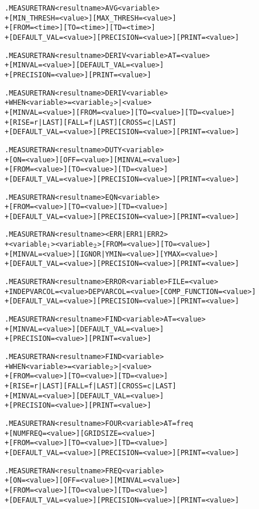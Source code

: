 \begin{Command}
\format
\begin{alltt}
.MEASURE TRAN <result name> AVG <variable>
+ [MIN_THRESH=<value>] [MAX_THRESH=<value>]
+ [FROM=<time>] [TO=<time>] [TD=<time>]
+ [DEFAULT_VAL=<value>] [PRECISION=<value>] [PRINT=<value>]

.MEASURE TRAN <result name> DERIV <variable> AT=<value>
+ [MINVAL=<value>] [DEFAULT_VAL=<value>] 
+ [PRECISION=<value>] [PRINT=<value>]

.MEASURE TRAN <result name> DERIV <variable>
+ WHEN <variable>=<variable\(\sb{2}\)>|<value>
+ [MINVAL=<value>] [FROM=<value>] [TO=<value>] [TD=<value>] 
+ [RISE=r|LAST] [FALL=f|LAST] [CROSS=c|LAST]
+ [DEFAULT_VAL=<value>] [PRECISION=<value>] [PRINT=<value>]

.MEASURE TRAN <result name> DUTY <variable>
+ [ON=<value>] [OFF=<value>] [MINVAL=<value>]
+ [FROM=<value>] [TO=<value>] [TD=<value>]
+ [DEFAULT_VAL=<value>] [PRECISION=<value>] [PRINT=<value>]

.MEASURE TRAN <result name> EQN <variable>
+ [FROM=<value>] [TO=<value>] [TD=<value>]
+ [DEFAULT_VAL=<value>] [PRECISION=<value>] [PRINT=<value>]

.MEASURE TRAN <result name> <ERR|ERR1|ERR2>
+ <variable\(\sb{1}\)> <variable\(\sb{2}\)> [FROM=<value>] [TO=<value>]
+ [MINVAL=<value>] [IGNOR|YMIN=<value>] [YMAX=<value>]
+ [DEFAULT_VAL=<value>] [PRECISION=<value>] [PRINT=<value>]

.MEASURE TRAN <result name> ERROR <variable> FILE=<value>
+ INDEPVARCOL=<value> DEPVARCOL=<value> [COMP_FUNCTION=<value>]
+ [DEFAULT_VAL=<value>] [PRECISION=<value>] [PRINT=<value>]

.MEASURE TRAN <result name> FIND <variable> AT=<value>
+ [MINVAL=<value>] [DEFAULT_VAL=<value>]
+ [PRECISION=<value>] [PRINT=<value>]

.MEASURE TRAN <result name> FIND <variable>
+ WHEN <variable>=<variable\(\sb{2}\)>|<value>
+ [FROM=<value>] [TO=<value>] [TD=<value>] 
+ [RISE=r|LAST] [FALL=f|LAST] [CROSS=c|LAST]
+ [MINVAL=<value>] [DEFAULT_VAL=<value>] 
+ [PRECISION=<value>] [PRINT=<value>]

.MEASURE TRAN <result name> FOUR <variable> AT=freq
+ [NUMFREQ=<value>] [GRIDSIZE=<value>]
+ [FROM=<value>] [TO=<value>] [TD=<value>] 
+ [DEFAULT_VAL=<value>] [PRECISION=<value>] [PRINT=<value>]

.MEASURE TRAN <result name> FREQ <variable>
+ [ON=<value>] [OFF=<value>] [MINVAL=<value>]
+ [FROM=<value>] [TO=<value>] [TD=<value>] 
+ [DEFAULT_VAL=<value>] [PRECISION=<value>] [PRINT=<value>]


\end{alltt}
\end{Command}
